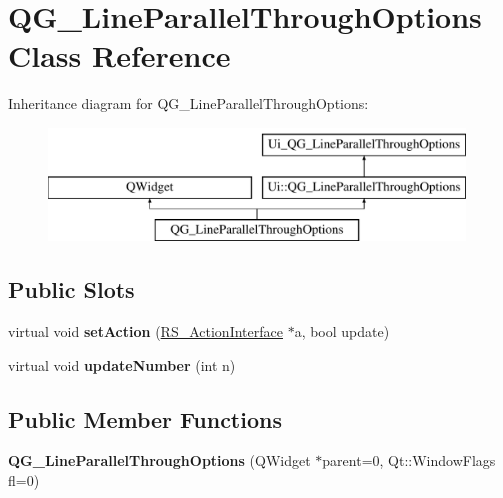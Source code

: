 \hypertarget{classQG__LineParallelThroughOptions}{\section{Q\-G\-\_\-\-Line\-Parallel\-Through\-Options Class Reference}
\label{classQG__LineParallelThroughOptions}
}
Inheritance diagram for Q\-G\-\_\-\-Line\-Parallel\-Through\-Options\-:\begin{figure}[H]
\begin{center}
\leavevmode
\includegraphics[height=3.000000cm]{classQG__LineParallelThroughOptions}
\end{center}
\end{figure}
\subsection*{Public Slots}
\begin{DoxyCompactItemize}
\item 
\hypertarget{classQG__LineParallelThroughOptions_a3b162500dcee25a573826f843b3fb678}{virtual void {\bfseries set\-Action} (\hyperlink{classRS__ActionInterface}{R\-S\-\_\-\-Action\-Interface} $\ast$a, bool update)}\label{classQG__LineParallelThroughOptions_a3b162500dcee25a573826f843b3fb678}

\item 
\hypertarget{classQG__LineParallelThroughOptions_a8fff7cc9dc335b895375f7b9edbc6711}{virtual void {\bfseries update\-Number} (int n)}\label{classQG__LineParallelThroughOptions_a8fff7cc9dc335b895375f7b9edbc6711}

\end{DoxyCompactItemize}
\subsection*{Public Member Functions}
\begin{DoxyCompactItemize}
\item 
\hypertarget{classQG__LineParallelThroughOptions_acdafcee5fff624271acb7a4db067edec}{{\bfseries Q\-G\-\_\-\-Line\-Parallel\-Through\-Options} (Q\-Widget $\ast$parent=0, Qt\-::\-Window\-Flags fl=0)}\label{classQG__LineParallelThroughOptions_acdafcee5fff624271acb7a4db067edec}

\end{DoxyCompactItemize}
